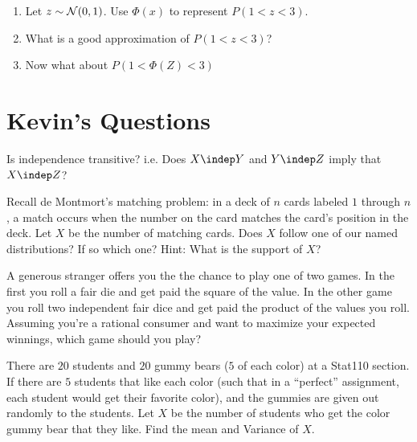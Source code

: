 \documentclass[11pt]{article}
\begin{document}
\begin{exercise}
\begin{enumerate}
\item Let $z\sim \mathcal{N}(0,1)$. Use $\Phi(x)$ to represent $P(1 < z < 3)$.
\item What is a good approximation of $P(1 < z < 3)$?
\item  Now what about $P(1 < \Phi(Z) < 3)$
\end{enumerate}
\end{exercise}
\vspace{2in}

\section{Kevin's Questions}
\begin{exercise}
Is independence transitive? i.e. Does  $X \indep Y$ and $Y \indep Z$ imply that  $X \indep Z$?
\end{exercise}
\vspace{2in}

\begin{exercise}[Matching]
Recall de Montmort’s matching problem: in a deck of $n$ cards labeled $1$ through $n$, a match occurs when the number on the card matches the card's position in the deck. Let $X$ be the number of matching cards. Does $X$ follow one of our named distributions? If so which one?
Hint: What is the support of $X$?
\end{exercise}
\vspace{2in}

\begin{exercise}
A generous stranger offers you the the chance to play one of two games. In the first you roll a fair die and get paid the square of the  value. In the other game you roll two independent fair dice and get paid the product of the values you roll. Assuming you’re a rational consumer and want to maximize your expected winnings, which game should you play?
\end{exercise}
\vspace{2in}

\begin{exercise}
There are $20$ students and $20$ gummy bears ($5$ of each color) at a Stat110 section. If there are $5$ students that like each color (such that in a ``perfect'' assignment, each student would get their favorite color), and the gummies are given out randomly to the students.  Let $X$ be the number of students who get the color gummy bear that they like. Find the mean and Variance of $X$.
\end{exercise}
\vspace{2in}
\end{document}
